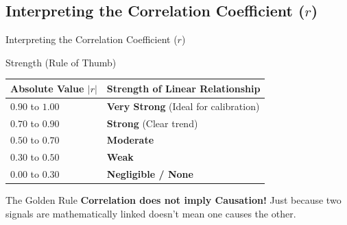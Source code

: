 \subsection{Interpreting the Correlation Coefficient ($r$)}
\begin{frame}{Interpreting the Correlation Coefficient ($r$)}

    \begin{block}{Strength (Rule of Thumb)}
        \centering
        \begin{tabular}{l l}
            \hline
            \textbf{Absolute Value $|r|$} & \textbf{Strength of Linear Relationship} \\
            \hline
            $0.90$ to $1.00$ & \textbf{Very Strong} (Ideal for calibration) \\
            $0.70$ to $0.90$ & \textbf{Strong} (Clear trend) \\
            $0.50$ to $0.70$ & \textbf{Moderate} \\
            $0.30$ to $0.50$ & \textbf{Weak} \\
            $0.00$ to $0.30$ & \textbf{Negligible / None} \\
            \hline
        \end{tabular}
    \end{block}

    \begin{block}{The Golden Rule}
        \textbf{Correlation does not imply Causation!} Just because two signals are mathematically linked doesn't mean one causes the other.
    \end{block}
\end{frame}

